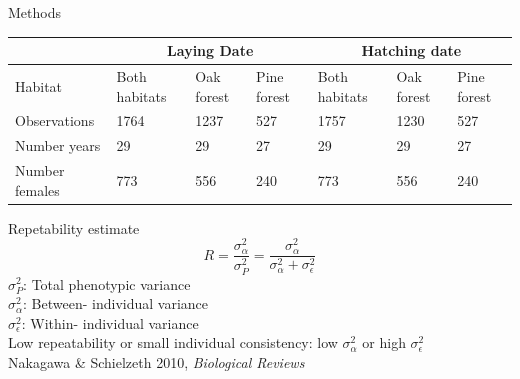 \documentclass[compress]{beamer}
\begin{document}
\begin{frame}{Methods}
\begin{table}[!h]
{\begin{tabular}{l|lll|lll|}
{\color[HTML]{333333} }                                         & \multicolumn{3}{c|}{{\color[HTML]{333333} Laying Date}}                                                                                                 & \multicolumn{3}{c|}{{\color[HTML]{333333} Hatching date}}                                                                                               \\ \hline
\multicolumn{1}{|l|}{{\color[HTML]{333333} Habitat}}            & \multicolumn{1}{l|}{{\color[HTML]{333333} Both habitats}} & \multicolumn{1}{l|}{{\color[HTML]{333333} Oak forest}} & {\color[HTML]{333333} Pine forest} & \multicolumn{1}{l|}{{\color[HTML]{333333} Both habitats}} & \multicolumn{1}{l|}{{\color[HTML]{333333} Oak forest}} & {\color[HTML]{333333} Pine forest} \\ \hline
\multicolumn{1}{|l|}{{\color[HTML]{333333} Observations}}       & \multicolumn{1}{l|}{{\color[HTML]{333333} 1764}}          & \multicolumn{1}{l|}{{\color[HTML]{333333} 1237}}       & {\color[HTML]{333333} 527}         & \multicolumn{1}{l|}{{\color[HTML]{333333} 1757}}          & \multicolumn{1}{l|}{{\color[HTML]{333333} 1230}}       & {\color[HTML]{333333} 527}         \\ \hline
\multicolumn{1}{|l|}{{\color[HTML]{333333} Number years}}       & \multicolumn{1}{l|}{{\color[HTML]{333333} 29}}            & \multicolumn{1}{l|}{{\color[HTML]{333333} 29}}         & {\color[HTML]{333333} 27}          & \multicolumn{1}{l|}{{\color[HTML]{333333} 29}}            & \multicolumn{1}{l|}{{\color[HTML]{333333} 29}}         & {\color[HTML]{333333} 27}          \\ \hline
\multicolumn{1}{|l|}{{\color[HTML]{333333} Number females}}     & \multicolumn{1}{l|}{{\color[HTML]{333333} 773}}           & \multicolumn{1}{l|}{{\color[HTML]{333333} 556}}        & {\color[HTML]{333333} 240}         & \multicolumn{1}{l|}{{\color[HTML]{333333} 773}}           & \multicolumn{1}{l|}{{\color[HTML]{333333} 556}}        & {\color[HTML]{333333} 240}         \\ \hline
\end{tabular}}
\end{table}

\begin{exampleblock}{Repetability estimate}
\[ R = \frac{\sigma_\alpha^2 }{\sigma_P^2} =  \frac{\sigma_\alpha^2 }{{\sigma_\alpha^2 }+{\sigma_\epsilon^2}}\]
\scriptsize
$\sigma_P^2$: Total phenotypic variance \\
$\sigma_\alpha^2$: Between- individual variance\\
$\sigma_\epsilon^2$: Within- individual variance \\

 \small
Low repeatability or small individual consistency: low $\sigma_\alpha^2$ or high $\sigma_\epsilon^2$ \\
 \raggedleft
\tiny
Nakagawa \& Schielzeth 2010, \textit{Biological Reviews}

\end{exampleblock}


\end{frame}
\end{document}
